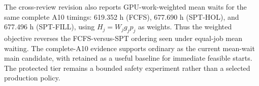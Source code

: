The cross-review revision also reports GPU-work-weighted mean waits for the same complete A10 timings: 619.352 h (FCFS), 677.690 h (SPT-HOL), and 677.496 h (SPT-FILL), using $H_j=W_jg_jp_j$ as weights. Thus the weighted objective reverses the FCFS-versus-SPT ordering seen under equal-job mean waiting. The complete-A10 evidence supports ordinary  as the current mean-wait main candidate, with  retained as a useful baseline for immediate feasible starts. The protected tier remains a bounded safety experiment rather than a selected production policy.
